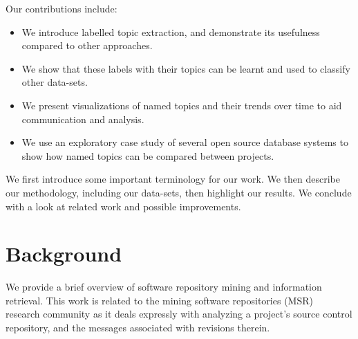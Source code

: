\documentclass{acm_proc_article-sp}
\newcommand{\XXX}[1]{\textcolor{red}{{\it \textbf{[XXX: #1]}}}}
\begin{document}

Our contributions include:
\begin{itemize}
\item  We introduce labelled topic extraction, and demonstrate its usefulness
  compared to other approaches.
\item We show that these labels with their topics can be learnt and used to classify other data-sets.
\item We present visualizations of named topics and their trends over time to aid communication and analysis.
\item We use an exploratory case study of
  several open source database systems to show how named topics can be compared between projects.
\end{itemize}

We first introduce some important terminology for our work. We then describe our methodology, including our data-sets, then highlight our results. We conclude with a look at related work and possible improvements.

\section{Background}

We provide a brief overview of software repository mining and information retrieval.
This work is related to the mining software repositories (MSR)~\cite{msr} research community as it deals expressly with analyzing a project's source control repository, and the messages associated with revisions therein.
\end{document}
